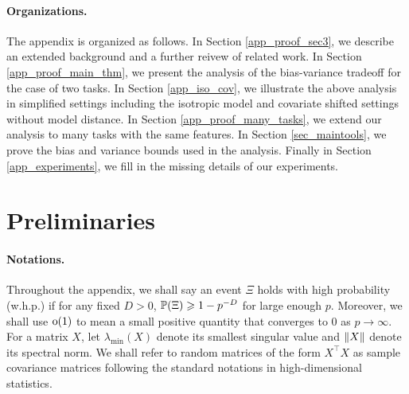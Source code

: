 \paragraph{Organizations.}
 The appendix is organized as follows.
In Section \ref{app_proof_sec3}, we describe an extended background and a further reivew of related work.
In Section \ref{app_proof_main_thm}, we present the analysis of the bias-variance tradeoff for the case of two tasks.
In Section \ref{app_iso_cov}, we illustrate the above analysis in simplified settings including the isotropic model and covariate shifted settings without model distance.
In Section \ref{app_proof_many_tasks}, we extend our analysis to many tasks with the same features.
In Section \ref{sec_maintools}, we prove the bias and variance bounds used in the analysis.
Finally in Section \ref{app_experiments}, we fill in the missing details of our experiments.


\section{Preliminaries}




\paragraph{Notations.}
Throughout the appendix, we shall say an event $\Xi$ holds with high probability (w.h.p.) if for any fixed $D>0$, $\P(\Xi)\ge 1- p^{-D}$ for large enough $p$. Moreover, we shall use $\oo(1)$ to mean a small positive quantity that converges to 0 as $p\to \infty$.
For a matrix $X$, let $\lambda_{\min}(X)$ denote its smallest singular value and $\norm{X}$ denote its spectral norm.
We shall refer to random matrices of the form $X^\top X$ as sample covariance matrices following the standard notations in high-dimensional statistics.


